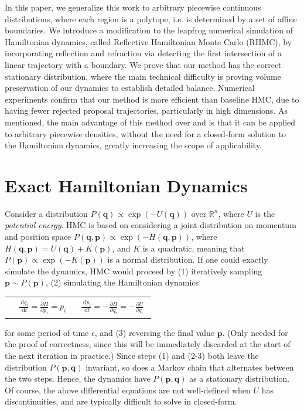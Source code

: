 \documentclass{article} %
\newcommand{\bvec}[1]{\textbf{#1}}
\newcommand{\dd}{\;\mathrm{d}} %
\begin{document}

In this paper, we generalize this work to arbitrary piecewise continuous distributions, where each region is a polytope, i.e. is determined by a set of affine boundaries.  We introduce a modification to the leapfrog numerical simulation of Hamiltonian dynamics, called Reflective Hamiltonian Monte Carlo (RHMC), by incorporating reflection and refraction via detecting the first intersection of a linear trajectory with a boundary. We prove that our method has the correct stationary distribution, where the main technical difficulty is proving volume preservation of our dynamics to establish detailed balance.  Numerical experiments confirm that our method is more efficient than baseline HMC, due to having fewer rejected proposal trajectories, particularly in high dimensions.  As mentioned, the main advantage of this method over \cite{pakman2014exact} and \cite{pakman2013auxiliary} is that it can be applied to arbitrary piecewise densities, without the need for a closed-form solution to the Hamiltonian dynamics, greatly increasing the scope of applicability.


\section{Exact Hamiltonian Dynamics }

Consider a distribution $P(\bvec{q})\propto \exp(-U(\bvec{q}))$ over $\mathbb{R}^n$, where $U$ is the \emph{potential energy}.  HMC \cite{neal2011mcmc} is based on considering a joint distribution on momentum and position space $P(\bvec{q}, \bvec{p})\propto\exp(-H(\bvec{q}, \bvec{p}))$, where $H(\bvec{q}, \bvec{p})=U(\bvec{q})+K(\bvec{p})$, and $K$ is a quadratic, meaning that $P(\bvec{p}) \propto \exp(-K(\bvec{p}))$ is a normal distribution.  If one could exactly simulate the dynamics, HMC would proceed by (1) iteratively sampling $\bvec{p} \sim P(\bvec{p})$, 
(2) simulating the Hamiltonian dynamics
%
\begin{tabular}{p{5.5cm}p{7.8cm}}
{
\begin{align}\label{e:motion1}
&
\frac{\dd q_i}{\dd t} = \frac{\partial H}{\partial p_{i}} = p_i
\end{align} }
&{
\begin{align}\label{e:motion2}
\frac{\dd p_i}{\dd t} = 
-\frac{\partial H}{\partial q_{i}} = 
-\frac{\partial U}{\partial q_{i}}
\end{align} 
}
\end{tabular}
%
for some period of time $\epsilon$, and (3) reversing the final value $\bvec{p}$.  (Only needed for the proof of correctness, since this will be immediately discarded at the start of the next iteration in practice.)  Since steps (1) and (2-3) both leave the distribution $P(\bvec{p}, \bvec{q})$ invariant, so does a Markov chain that alternates between the two steps.  Hence, the dynamics have $P(\bvec{p}, \bvec{q})$ as a stationary distribution.  Of course, the above differential equations are not well-defined when $U$ has discontinuities, and are typically difficult to solve in closed-form.
\end{document}
